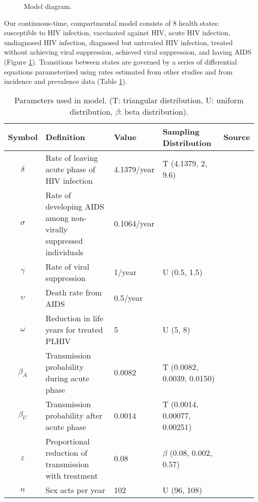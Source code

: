 \documentclass[11pt]{article}
\begin{document}
\begin{figure}
  \centering
  
  \caption{Model diagram.}
  \label{model_diag}
\end{figure}

Our continuous-time, compartmental model consists of 8 health states:
susceptible to HIV infection, vaccinated against HIV, acute HIV
infection, undiagnosed HIV infection, diagnosed but untreated HIV
infection, treated without achieving viral suppression, achieved viral
suppression, and having AIDS (Figure \ref{model_diag}). Transitions
between states are governed by a series of differential equations
parameterized using rates estimated from other studies and from
incidence and prevalence data (Table \ref{model_param}).


\begin{table}
\begin{center}
  \begin{tabular}{cp{4cm}llc}
\hline
    Symbol & Definition & Value & Sampling Distribution & Source \\ \hline
    $\delta$	& Rate of leaving acute phase of HIV infection & 4.1379/year & T (4.1379, 2, 9.6) & \cite{Hollingsworth2008-iy} \\
    $\sigma$	& Rate of developing AIDS among non-virally suppressed individuals
                       & 0.1064/year & & \cite{Morgan2002-cq} \\
    $\gamma$ & Rate of viral suppression & 1/year & U (0.5, 1.5) & \cite{Currie2009-yz} \\
    $\upsilon$	& Death rate from AIDS & 0.5/year &  & \cite{Morgan2002-cq} \\
    $\omega$	& Reduction in life years for treated PLHIV & 5 & U (5, 8) & \cite{Unaids2014-ue, Samji2013-kf}\\
    $\beta_{A}$	& Transmission probability during acute phase & 0.0082 & T (0.0082, 0.0039, 0.0150) & \cite{Skarbinski2015-ni,Wawer2005-us}\\
    $\beta_{U}$	& Transmission probability after acute phase & 0.0014 & T (0.0014, 0.00077, 0.00251) & \cite{Hughes2012-so}\\
    $\varepsilon$	& Proportional reduction of transmission with treatment & 0.08 & $\beta$ (0.08, 0.002, 0.57)& \cite{Donnell2010-xo}\\
    $n$			& Sex acts per year & 102 & U (96, 108) & \cite{Wawer2005-us,Abdool_Karim2010-cm}\\ \hline
  \end{tabular}
\caption{Parameters used in model. (T: triangular distribution, U:
  uniform distribution, $\beta$: beta distribution).}
\end{center}
\label{model_param}
\end{table}
\end{document}
